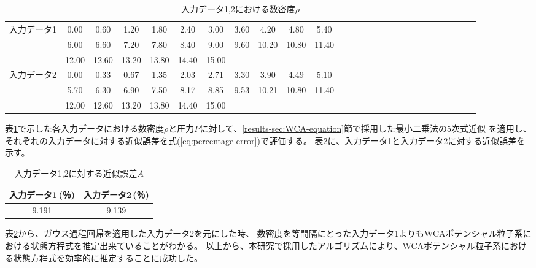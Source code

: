 \documentclass[titlepage]{jsreport}
\begin{document}
{{{\newpage
\begin{table}[htbp]
    \begin{center}
        \caption{入力データ1,2における数密度$\rho$}
        \label{table:compare-Gauss}
            \begin{tabular}{c||c c c c c c c c c c c c c c c c c c c c c c c c c c}
               
                    入力データ1& 0.00&0.60&1.20&1.80&2.40&3.00&3.60&4.20&4.80&5.40\\
                    &6.00&6.60&7.20&7.80&8.40&9.00&9.60&10.20&10.80&11.40\\
                    &12.00&12.60&13.20&13.80&14.40&15.00\\ \hline
                    入力データ2& 0.00&0.33&0.67&1.35&2.03&2.71&3.30&3.90&4.49&5.10\\
                    &5.70&6.30&6.90&7.50&8.17&8.85&9.53&10.21&10.80&11.40\\
                    &12.00&12.60&13.20&13.80&14.40&15.00
            \end{tabular}
    \end{center}
\end{table}

表\ref{table:compare-Gauss}で示した各入力データにおける数密度$\rho$と圧力$P$に対して、\ref{results-sec:WCA-equation}節で採用した最小二乗法の5次式近似
を適用し、それぞれの入力データに対する近似誤差を式(\ref{eq:percentage-error})で評価する。
表\ref{table:compare-approximation-accuracy}に、入力データ1と入力データ2に対する近似誤差を示す。

\begin{table}[htbp]
    \begin{center}
        \caption{入力データ1,2に対する近似誤差$A$}
        \label{table:compare-approximation-accuracy}
            \begin{tabular}{c c}
                    入力データ1\,(％) & 入力データ2\,(％) \\ \hline\hline
                    9.191 & 9.139
            \end{tabular}
    \end{center}
\end{table}

表\ref{table:compare-approximation-accuracy}から、ガウス過程回帰を適用した入力データ2を元にした時、
数密度を等間隔にとった入力データ1よりもWCAポテンシャル粒子系における状態方程式を推定出来ていることがわかる。
以上から、本研究で採用したアルゴリズムにより、WCAポテンシャル粒子系における状態方程式を効率的に推定することに成功した。

}}}
\end{document}

